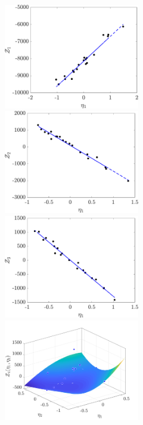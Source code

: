 \begin{figure}[htbp]
\begin{center}
\begin{subfigure}{0.35\textwidth}
\end{subfigure}
\hspace{-0.5cm}
\begin{subfigure}{0.35\textwidth}
\includegraphics[width=0.65\textwidth]{./Figures/SSP_Zf1} 
\\
\includegraphics[width=0.65\textwidth]{./Figures/SSP_Zf2} 
\\
\includegraphics[width=0.65\textwidth]{./Figures/SSP_Zf3} 
\\
\includegraphics[width=0.65\textwidth]{./Figures/SSP2D_Zf4} 

\end{subfigure}
\end{center}
\end{figure}
